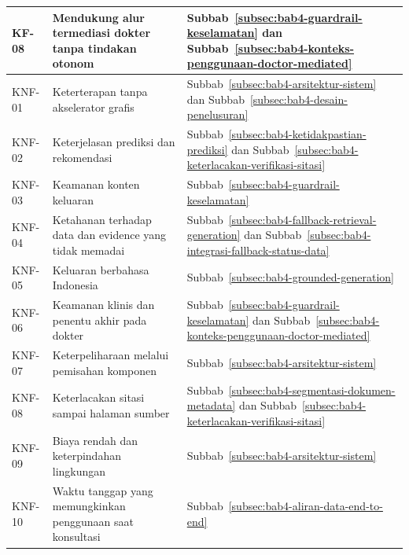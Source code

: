 \begin{longtable}{@{}>{\raggedright\arraybackslash}p{1.750cm}>{\raggedright\arraybackslash}p{5.350cm}>{\raggedright\arraybackslash}p{6.338cm}@{}}
KF-08 & Mendukung alur termediasi dokter tanpa tindakan otonom & Subbab~\ref{subsec:bab4-guardrail-keselamatan} dan Subbab~\ref{subsec:bab4-konteks-penggunaan-doctor-mediated} \\

\midrule

KNF-01 & Keterterapan tanpa akselerator grafis & Subbab~\ref{subsec:bab4-arsitektur-sistem} dan Subbab~\ref{subsec:bab4-desain-penelusuran} \\

KNF-02 & Keterjelasan prediksi dan rekomendasi & Subbab~\ref{subsec:bab4-ketidakpastian-prediksi} dan Subbab~\ref{subsec:bab4-keterlacakan-verifikasi-sitasi} \\

KNF-03 & Keamanan konten keluaran & Subbab~\ref{subsec:bab4-guardrail-keselamatan} \\

KNF-04 & Ketahanan terhadap data dan evidence yang tidak memadai & Subbab~\ref{subsec:bab4-fallback-retrieval-generation} dan Subbab~\ref{subsec:bab4-integrasi-fallback-status-data} \\

KNF-05 & Keluaran berbahasa Indonesia & Subbab~\ref{subsec:bab4-grounded-generation} \\

KNF-06 & Keamanan klinis dan penentu akhir pada dokter & Subbab~\ref{subsec:bab4-guardrail-keselamatan} dan Subbab~\ref{subsec:bab4-konteks-penggunaan-doctor-mediated} \\

KNF-07 & Keterpeliharaan melalui pemisahan komponen & Subbab~\ref{subsec:bab4-arsitektur-sistem} \\

KNF-08 & Keterlacakan sitasi sampai halaman sumber & Subbab~\ref{subsec:bab4-segmentasi-dokumen-metadata} dan Subbab~\ref{subsec:bab4-keterlacakan-verifikasi-sitasi} \\

KNF-09 & Biaya rendah dan keterpindahan lingkungan & Subbab~\ref{subsec:bab4-arsitektur-sistem} \\

KNF-10 & Waktu tanggap yang memungkinkan penggunaan saat konsultasi & Subbab~\ref{subsec:bab4-aliran-data-end-to-end} \\
\end{longtable}
\endgroup
